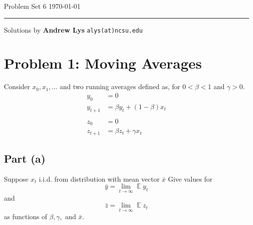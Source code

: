 \documentclass{amsart}
\DeclareMathOperator{\ee}{\mathbb{E}}
\theoremstyle{definition}
\begin{document}
\noindent
Problem Set 6  \hfill \today  %
\smallskip
\hrule
\smallskip
\noindent
Solutions by {\bf Andrew Lys} \qquad   %
  {\tt alys(at)ncsu.edu}

\vspace{0.5cm}
\section*{Problem 1: Moving Averages}
Consider $x_0, x_1, \ldots$ and two running averages defined as, for $0 < \beta < 1$ and $\gamma > 0$. 
\begin{align*}
    y_0 &= 0\\
    y_{t + 1} &= \beta y_t + (1 - \beta) x_t\\
    \\
    z_0 &= 0 \\
    z_{t + 1} &= \beta z_t + \gamma x_t
\end{align*}
\subsection*{Part (a)} Suppose $x_t$ i.i.d. from distribution with mean vector $\bar{x}$
Give values for 
\[
\bar{y} = \lim_{t \to \infty} \ee{y_t}
\]
and 
\[
\bar{z} = \lim_{t\to \infty} \ee{z_t}
\]
as functions of $\beta, \gamma,$ and $\bar{x}$. 
\end{document}
